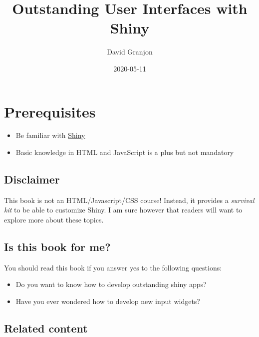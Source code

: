 \documentclass[]{book}
\title{Outstanding User Interfaces with Shiny}
\author{David Granjon}
\date{2020-05-11}
\providecommand{\tightlist}{%
  \setlength{\itemsep}{0pt}\setlength{\parskip}{0pt}}
\begin{document}
\maketitle

{
\setcounter{tocdepth}{1}
\tableofcontents
}
\hypertarget{prerequisites}{%
\chapter*{Prerequisites}\label{prerequisites}}

\begin{itemize}
\tightlist
\item
  Be familiar with \href{https://mastering-shiny.org}{Shiny}
\item
  Basic knowledge in HTML and JavaScript is a plus but not mandatory
\end{itemize}

\hypertarget{disclaimer}{%
\section*{Disclaimer}\label{disclaimer}}

This book is not an HTML/Javascript/CSS course! Instead, it provides a \emph{survival kit} to be able to customize Shiny. I am sure however that readers will want to explore more about these topics.

\hypertarget{is-this-book-for-me}{%
\section*{Is this book for me?}\label{is-this-book-for-me}}

You should read this book if you answer yes to the following questions:

\begin{itemize}
\tightlist
\item
  Do you want to know how to develop outstanding shiny apps?
\item
  Have you ever wondered how to develop new input widgets?
\end{itemize}

\hypertarget{related-content}{%
\section*{Related content}\label{related-content}}
\end{document}
